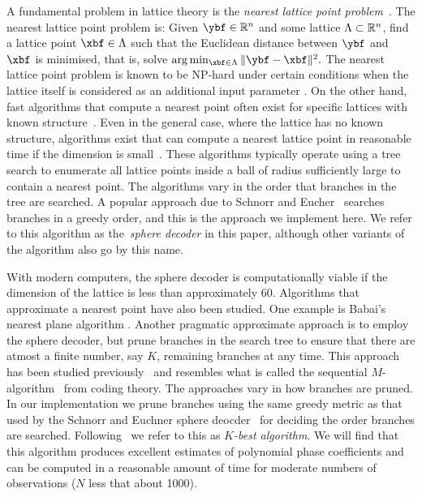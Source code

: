\documentclass[journal]{IEEEtran}
\begin{document}
A fundamental problem in lattice theory is the \emph{nearest lattice point problem}~\cite{Agrell2002}. The nearest lattice point problem is: Given $\ybf\in\reals^n$ and some lattice $\Lambda \subset {\mathbb R}^n$, find a lattice point $\xbf \in \Lambda$ such that the Euclidean distance between $\ybf$ and $\xbf$ is minimised, that is, solve $\arg\min_{\xbf \in \Lambda} \|\ybf - \xbf\|^2.$  The nearest lattice point problem is known to be NP-hard under certain conditions when the lattice itself is considered as an additional input parameter \cite{micciancio_hardness_2001, AjtaiShortestVecProbNPHard1998}.  On the other hand,  fast algorithms that compute a nearest point often exist for specific lattices with known structure~\cite{SPLAG,Conway1982FastQuantDec,McKilliam2009CoxeterLattices,McKilliam2008}.  Even in the general case, where the lattice has no known structure, algorithms exist that can compute a nearest lattice point in reasonable time if the dimension is small~\cite{Agrell2002, Viterbo_sphere_decoder_1999, Pohst_sphere_decoder_1981}. These algorithms typically operate using a tree search to enumerate all lattice points inside a ball of radius sufficiently large to contain a nearest point.  The algorithms vary in the order that branches in the tree are searched.  A popular approach due to Schnorr and Eucher~\cite{schnorr_euchner_sd_1994,Agrell2002} searches branches in a greedy order, and this is the approach we implement here.  We refer to this algorithm as the~\emph{sphere decoder} in this paper, although other variants of the algorithm also go by this name.  

With modern computers, the sphere decoder is computationally viable if the dimension of the lattice is less than approximately $60$.  Algorithms that approximate a nearest point have also been studied.  One example is Babai's nearest plane algorithm \cite{Babai1986}.  Another pragmatic approximate approach is to employ the sphere decoder, but prune branches in the search tree to ensure that there are atmost a finite number, say $K$, remaining branches at any time.  This approach has been studied previously~\cite{Baro_list_sphere_dec_2003,Zhan2006_K_best_sphere_decoder,Mondal_Kbest_again_2009} and resembles what is called the sequential $M$-algorithm~\citep{Anderson1984_seq_coding_alg} from coding theory.  The approaches vary in how branches are pruned.  In our implementation we prune branches using the same greedy metric as that used by the Schnorr and Euchner sphere deocder~\cite{schnorr_euchner_sd_1994,Agrell2002} for deciding the order branches are searched.  Following~\cite{Zhan2006_K_best_sphere_decoder} we refer to this as \emph{$K$-best algorithm}.  We will find that this algorithm produces excellent estimates of polynomial phase coefficients and can be computed in a reasonable amount of time for moderate numbers of observations ($N$ less that about 1000).
\end{document}
